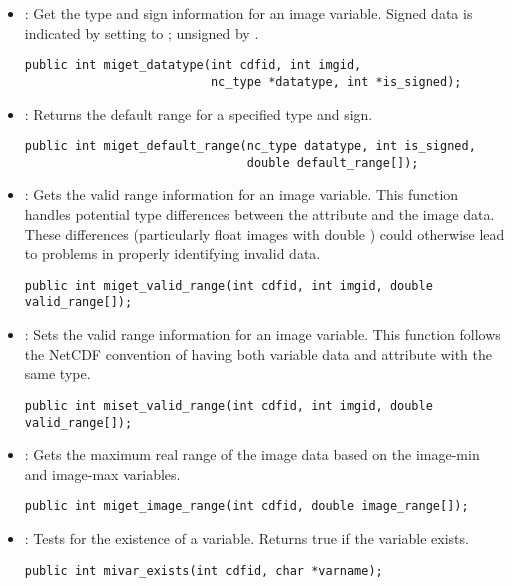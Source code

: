 \documentclass{article}
\begin{document}
\begin{itemize}

\item {} : Get the type and sign information for
an image variable. Signed data is indicated by setting
 to ; unsigned by .
\begin{verbatim}
public int miget_datatype(int cdfid, int imgid,
                          nc_type *datatype, int *is_signed);
\end{verbatim}

\item {} : Returns the default range for a
specified type and sign.
\begin{verbatim}
public int miget_default_range(nc_type datatype, int is_signed,
                               double default_range[]);
\end{verbatim}

\item {} : Gets the valid range information
for an image variable. This function handles potential type
differences between the  attribute and the image
data. These differences (particularly float images with double
) could otherwise lead to problems in properly
identifying invalid data.
\begin{verbatim}
public int miget_valid_range(int cdfid, int imgid, double valid_range[]);
\end{verbatim}

\item {} : Sets the valid range information
for an image variable. This function follows the NetCDF convention of
having both variable data and  attribute with the
same type.
\begin{verbatim}
public int miset_valid_range(int cdfid, int imgid, double valid_range[]);
\end{verbatim}

\item {} : Gets the maximum real range of the
image data based on the image-min and image-max variables.
\begin{verbatim}
public int miget_image_range(int cdfid, double image_range[]);
\end{verbatim}

\item {} : Tests for the existence of a
variable. Returns true if the variable exists.
\begin{verbatim}
public int mivar_exists(int cdfid, char *varname);
\end{verbatim}


\end{itemize}
\end{document}
